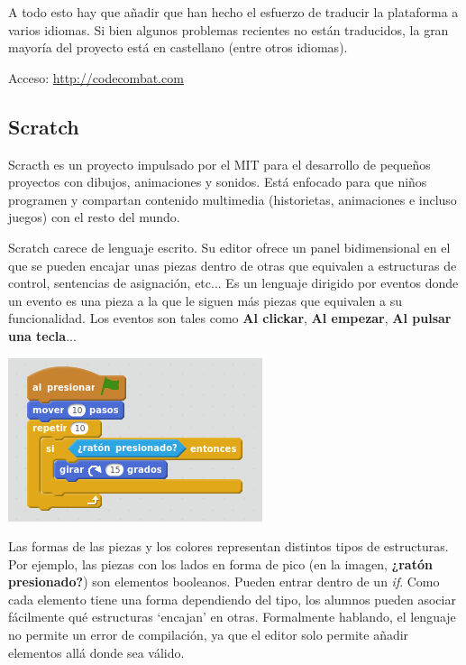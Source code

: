 \documentclass{report}
\begin{document}
	\vspace{10px}
	
	A todo esto hay que añadir que han hecho el esfuerzo de traducir la plataforma a varios idiomas. Si bien algunos problemas recientes no están traducidos, la gran mayoría del proyecto está en castellano (entre otros idiomas).
	
	\vspace{10px}
	
	Acceso: \url{http://codecombat.com}
	
	\subsection{Scratch}
	
	Scracth es un proyecto impulsado por el MIT para el desarrollo de pequeños proyectos con dibujos, animaciones y sonidos. Está enfocado para que niños programen y compartan contenido multimedia (historietas, animaciones e incluso juegos) con el resto del mundo. 
	
	Scratch carece de lenguaje escrito. Su editor ofrece un panel bidimensional en el que se pueden encajar unas piezas dentro de otras que equivalen a estructuras de control, sentencias de asignación, etc... Es un lenguaje dirigido por eventos donde un evento es una pieza a la que le siguen más piezas que equivalen a su funcionalidad. Los eventos son tales como \textbf{Al clickar}, \textbf{Al empezar}, \textbf{Al pulsar una tecla}...
	
	
	\begin{center}
	\includegraphics[width=0.7\linewidth]{scratch}
	\end{center}

	Las formas de las piezas y los colores representan distintos tipos de estructuras. Por ejemplo, las piezas con los lados en forma de pico (en la imagen, \textbf{¿ratón presionado?}) son elementos booleanos. Pueden entrar dentro de un \textit{if}. Como cada elemento tiene una forma dependiendo del tipo, los alumnos pueden asociar fácilmente qué estructuras `encajan' en otras. Formalmente hablando, el lenguaje no permite un error de compilación, ya que el editor solo permite añadir elementos allá donde sea válido.
\end{document}
